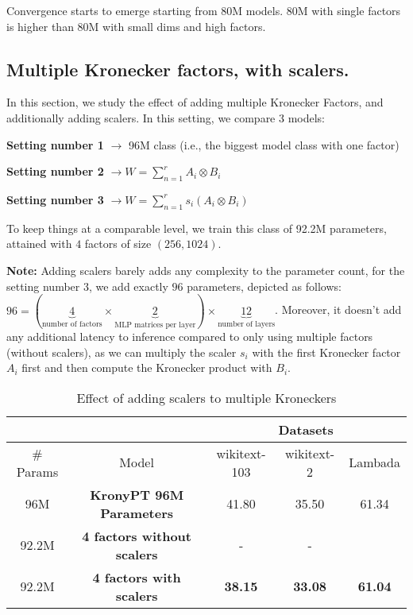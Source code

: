 \documentclass{article}
\begin{document}
{Convergence starts to emerge starting from 80M models.   80M with single factors is higher than 80M with small dims and high factors.

\subsection{Multiple Kronecker factors, with scalers.}%
\label{sub:Multiple Kronecker factors, with scalers.}

In this section, we study the effect of adding multiple Kronecker Factors, and additionally adding scalers. In this setting, we compare 3 models:

\textbf{Setting number 1} $\rightarrow$ 96M class (i.e., the biggest model class with one factor)

\textbf{Setting number 2} $\rightarrow W = \sum_{n=1}^{r} A_i \otimes B_i $ 

\textbf{Setting number 3} $\rightarrow W  = \sum_{n=1}^{r} s_i (A_i \otimes B_i)$

To keep things at a comparable level, we train this class of 92.2M parameters, attained with $4$ factors of size $(256, 1024)$. 


\textbf{Note:} Adding scalers barely adds any complexity to the parameter count, for the setting number 3, we add exactly $96$ parameters, depicted as follows: $96 = (\underbrace{4}_{\text{number of factors}} \times \underbrace{2}_{\text{MLP matrices per layer}}) \times \underbrace{12}_{\text{number of layers}}$. Moreover, it doesn't add any additional latency to inference compared to only using multiple factors (without scalers), as we can multiply the scaler $s_i$ with the first Kronecker factor $A_i$ first and then compute the Kronecker product with $B_i$.

\begin{table}[h]
\centering
\begin{tabular}{|c|c|c|c|c|}
\hline
 & & \multicolumn{3}{c|}{Datasets} \\ \hline
\# Params &  Model            & wikitext-103 & wikitext-2 & Lambada \\ \hline
96M       & \textbf{KronyPT 96M Parameters}  & 41.80        & 35.50      & 61.34         \\ \hline
92.2M     & \textbf{4 factors without scalers} & -            & -          &       \\ \hline
92.2M     & \textbf{4 factors with scalers}  &  \textbf{38.15}   & \textbf{33.08}      & \textbf{61.04} \\ \hline
\end{tabular}
\caption{Effect of adding scalers to multiple Kroneckers}


\end{table}}
\end{document}
